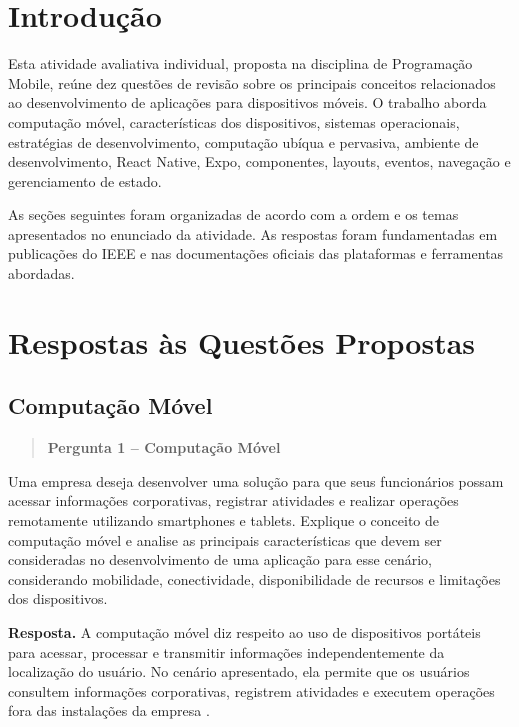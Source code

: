 \documentclass[
    12pt,
    oneside,
    a4paper,
    brazil
]{abntex2}
\newcommand{\pergunta}[2]{%
\begin{quote}
\noindent\textbf{Pergunta #1 -- #2}
\end{quote}}
\newcommand{\resposta}{%
\par\noindent\textbf{Resposta.}\hspace{0.3em}
}
\newcommand{\disciplina}{Programação Mobile}
\begin{document}
\tableofcontents*
\cleardoublepage

\textual

\chapter{Introdução}

Esta atividade avaliativa individual, proposta na disciplina de \disciplina, reúne dez questões de revisão sobre os principais conceitos relacionados ao desenvolvimento de aplicações para dispositivos móveis. O trabalho aborda computação móvel, características dos dispositivos, sistemas operacionais, estratégias de desenvolvimento, computação ubíqua e pervasiva, ambiente de desenvolvimento, React Native, Expo, componentes, layouts, eventos, navegação e gerenciamento de estado.

As seções seguintes foram organizadas de acordo com a ordem e os temas apresentados no enunciado da atividade. As respostas foram fundamentadas em publicações do IEEE e nas documentações oficiais das plataformas e ferramentas abordadas.

\chapter{Respostas às Questões Propostas}

\section{Computação Móvel}
\pergunta{1}{Computação Móvel}

Uma empresa deseja desenvolver uma solução para que seus funcionários possam acessar informações corporativas, registrar atividades e realizar operações remotamente utilizando smartphones e tablets. Explique o conceito de computação móvel e analise as principais características que devem ser consideradas no desenvolvimento de uma aplicação para esse cenário, considerando mobilidade, conectividade, disponibilidade de recursos e limitações dos dispositivos.

\resposta A computação móvel diz respeito ao uso de dispositivos portáteis para acessar, processar e transmitir informações independentemente da localização do usuário. No cenário apresentado, ela permite que os usuários consultem informações corporativas, registrem atividades e executem operações fora das instalações da empresa \cite{forman1994}. 
\end{document}
